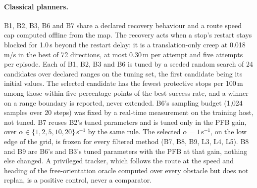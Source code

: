 \documentclass[11pt]{article}
\theoremstyle{definition}
\begin{document}
\paragraph{Classical planners.} B1, B2, B3, B6 and B7 share a declared recovery behaviour and a route speed cap
computed offline from the map. The recovery acts when a stop's restart stays blocked for 1.0\,s beyond the restart
delay: it is a translation-only creep at 0.018\,m/s in the best of 72 directions, at most 0.30\,m per attempt and five
attempts per episode. Each of B1, B2, B3 and B6 is tuned by a seeded random search of 24 candidates over declared
ranges on the tuning set, the first candidate being its initial values. The selected candidate has the fewest
protective stops per 100\,m among those within five percentage points of the best success rate, and a winner on a range
boundary is reported, never extended. B6's sampling budget (1{,}024 samples over 20 steps) was fixed by a real-time
measurement on the training host, not tuned. B7 reuses B2's tuned parameters and is tuned only in the PFB gain, over
$\alpha\in\{1,2,5,10,20\}$\,s$^{-1}$ by the same rule. The selected $\alpha=1$\,s$^{-1}$, on the low edge of the grid,
is frozen for every filtered method (B7, B8, B9, L3, L4, L5). B8 and B9 are B6's and B3's tuned parameters with the PFB
at that gain, nothing else changed. A privileged tracker, which follows the route at the speed and heading of the
free-orientation oracle computed over every obstacle but does not replan, is a positive control, never a comparator.
\end{document}
